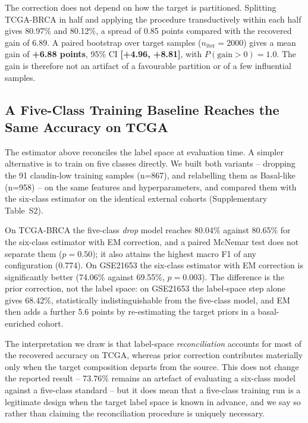 \documentclass[10pt,journal,compsoc,twocolumn]{IEEEtran}
\begin{document}
The correction does not depend on how the target is partitioned. Splitting TCGA-BRCA in half and applying the procedure transductively within each half gives 80.97\% and 80.12\%, a spread of 0.85 points compared with the recovered gain of 6.89. A paired bootstrap over target samples ($n_{\text{iter}} = 2000$) gives a mean gain of \textbf{+6.88 points}, 95\% CI \textbf{[+4.96, +8.81]}, with $P(\text{gain} > 0) = 1.0$. The gain is therefore not an artifact of a favourable partition or of a few influential samples.

\subsection{A Five-Class Training Baseline Reaches the Same Accuracy on TCGA}
\label{sec:fiveclass}

The estimator above reconciles the label space at evaluation time. A simpler
alternative is to train on five classes directly. We built both variants -- dropping
the 91 claudin-low training samples (n=867), and relabelling them as Basal-like
(n=958) -- on the same features and hyperparameters, and compared them with the
six-class estimator on the identical external cohorts (Supplementary
Table~S2).

On TCGA-BRCA the five-class \emph{drop} model reaches 80.04\% against 80.65\% for the
six-class estimator with EM correction, and a paired McNemar test does not separate
them ($p = 0.50$); it also attains the highest macro F1 of any configuration (0.774).
On GSE21653 the six-class estimator with EM correction is significantly better
(74.06\% against 69.55\%, $p = 0.003$). The difference is the prior correction, not the
label space: on GSE21653 the label-space step alone gives 68.42\%, statistically
indistinguishable from the five-class model, and EM then adds a further 5.6 points by
re-estimating the target priors in a basal-enriched cohort.

The interpretation we draw is that label-space \emph{reconciliation} accounts for most
of the recovered accuracy on TCGA, whereas prior correction contributes materially only
when the target composition departs from the source. This does not change the reported
result -- 73.76\% remains an artefact of evaluating a six-class model against a
five-class standard -- but it does mean that a five-class training run is a legitimate
design when the target label space is known in advance, and we say so rather than
claiming the reconciliation procedure is uniquely necessary.
\end{document}
